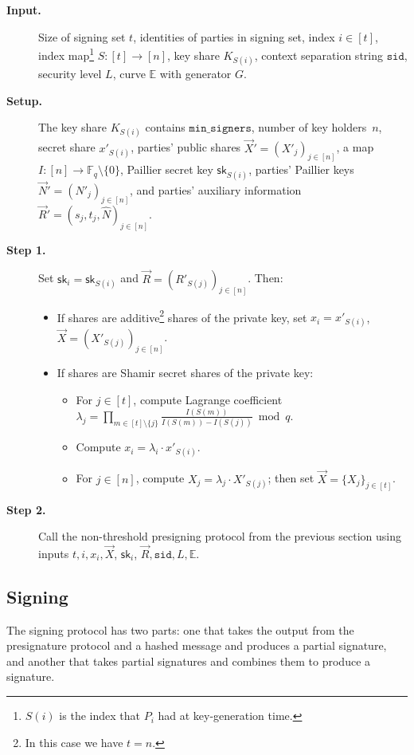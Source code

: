 \documentclass[11pt]{article}
\newcommand{\threshold}{\ensuremath{\mathtt{min\_signers}}}
\newcommand{\sid}{\ensuremath{\mathtt{sid}}}
\newcommand{\sk}{\textsf{sk}}
\newcommand{\Fq}{\mathbb{F}_q}
\newcommand{\E}{\mathbb{E}}
\newcommand{\?}[1]{\stackrel{?}{#1}}
\begin{document}
\begin{description}

\item[\bf Input.] Size of signing set $t$, identities of parties in signing set,
 index $i\in [t]$, index map\footnote{$S(i)$ is the index that $P_i$ had at key-generation time.} $S : [t] \to [n]$, key share $K_{S(i)}$, context separation string $\sid$, security level $L$, curve $\E$ with generator $G$.

    \item[\bf Setup.] The key share $K_{S(i)}$ contains $\threshold$, number of key holders~$n$, secret share $x'_{S(i)}$, parties' public shares $\vec X' = (X'_j)_{j \in [n]}$, a map $I : [n] \to \Fq \setminus \{0\}$, Paillier secret key $\sk_{S(i)}$, parties' Paillier keys $\vec N' = (N'_j)_{j \in [n]}$, and parties' auxiliary information $\vec R' = (s_j, t_j, \hat N)_{j \in [n]}$.

    \item[\bf Step 1.] Set $\sk_i = \sk_{S(i)}$ and 
            $\vec R = (R'_{S(j)})_{j \in [n]}$. Then:
    \begin{itemize}
           \item If shares are additive\footnote{In this case we have $t=n$.} shares of the private key, 
            set $x_{i} = x'_{S(i)}$, $\vec X = (X'_{S(j)})_{j \in [n]}$.

        
        \item If shares are Shamir secret shares of the private key: 

        \begin{itemize}
        \item For $j \in [t]$, compute Lagrange coefficient $\lambda_j = \prod\limits_{m \in [t]\setminus\{j\}} \frac{I(S(m))}{I(S(m)) - I(S(j))} \bmod{q}$.
            \item Compute $x_{i} = \lambda_i \cdot x'_{S(i)}$.
            \item For $j \in [n]$, compute $X_j= \lambda_j \cdot X'_{S(j)}$; then set $\vec X = \{X_j\}_{j \in [t]}$.
        \end{itemize}
    \end{itemize}

    \item[\bf Step 2.] Call the non-threshold presigning protocol from the previous section using inputs $t, i, x_i, \vec X$, $\sk_i$, $\vec R, \sid, L, \E$.
\end{description}


\subsection{Signing}
\label{sec:signing}
The
signing protocol has two parts: one that takes the output from the presignature protocol and a hashed message and produces a partial signature, and another that takes partial signatures and combines them to produce a signature. 
    
\end{document}
